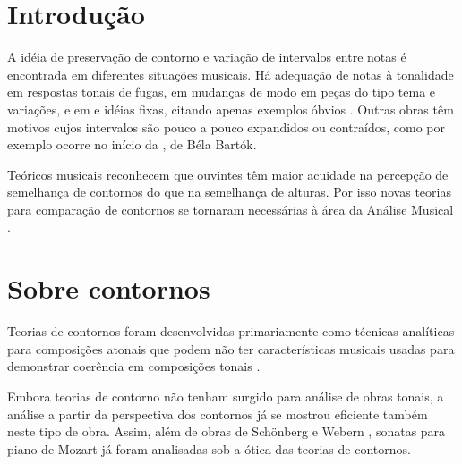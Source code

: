 \chapter{Introdução}
\label{cha:introducao}

A idéia de preservação de contorno e variação de intervalos entre
notas é encontrada em diferentes situações musicais. Há adequação de
notas à tonalidade em respostas tonais de fugas, em mudanças de modo
em peças do tipo tema e variações, e em  e idéias
fixas, citando apenas exemplos óbvios
\cite[p. 29]{morris87:composition}. Outras obras têm motivos cujos
intervalos são pouco a pouco expandidos ou contraídos, como por
exemplo ocorre no início da , de Béla Bartók.

Teóricos musicais reconhecem que ouvintes têm maior acuidade na
percepção de semelhança de contornos do que na semelhança de
alturas. Por isso novas teorias para comparação de contornos se
tornaram necessárias à área da Análise Musical
\cite[p. 226]{marvin.ea87:relating}.

\chapter{Sobre contornos}
\label{cha:sobre-contornos}




Teorias de contornos foram desenvolvidas primariamente como técnicas
analíticas para composições atonais que podem não ter características
musicais usadas para demonstrar coerência em composições tonais
\cite[p. 1]{beard03:contour}.

Embora teorias de contorno não tenham surgido para análise de obras
tonais, a análise a partir da perspectiva dos contornos já se mostrou
eficiente também neste tipo de obra. Assim, além de obras de Schönberg
\cite{friedmann85:methodology} e Webern \cite{clifford95:contour},
sonatas para piano de Mozart \cite{beard03:contour} já foram
analisadas sob a ótica das teorias de contornos.

